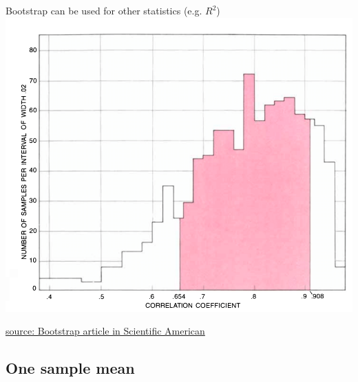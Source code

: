 \documentclass[10pt]{beamer}\usepackage[]{graphicx}\usepackage[]{color}
\begin{document}
\begin{frame}{Bootstrap can be used for other statistics (e.g. $R^2$)}
	\centering
	\includegraphics[scale=0.29]{bootcorr.png}
	
	\vspace{0.1in}
	
	\tiny \href{https://www.dropbox.com/s/cxiq70zxxtyxlb5/EfronDiaconisBootstrap.pdf?dl=0}{source: Bootstrap article in Scientific American}
\end{frame}


\subsection{One sample mean}
\end{document}
